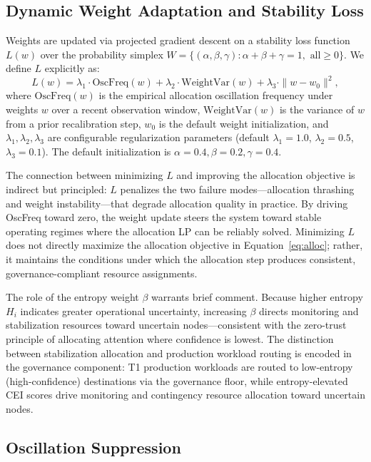 \documentclass[runningheads]{llncs}
\begin{document}
\subsection{Dynamic Weight Adaptation and Stability Loss}

Weights are updated via projected gradient descent on a stability loss function $L(w)$ over the probability simplex $W = \{(\alpha, \beta, \gamma) : \alpha + \beta + \gamma = 1, \text{ all} \geq 0\}$. We define $L$ explicitly as:
\begin{equation}
L(w) = \lambda_1 \cdot \text{OscFreq}(w) + \lambda_2 \cdot \text{WeightVar}(w) + \lambda_3 \cdot \|w - w_0\|^2,
\label{eq:stability}
\end{equation}
where $\text{OscFreq}(w)$ is the empirical allocation oscillation frequency under weights $w$ over a recent observation window, $\text{WeightVar}(w)$ is the variance of $w$ from a prior recalibration step, $w_0$ is the default weight initialization, and $\lambda_1, \lambda_2, \lambda_3$ are configurable regularization parameters (default $\lambda_1 = 1.0$, $\lambda_2 = 0.5$, $\lambda_3 = 0.1$). The default initialization is $\alpha = 0.4, \beta = 0.2, \gamma = 0.4$.

The connection between minimizing $L$ and improving the allocation objective is indirect but principled: $L$ penalizes the two failure modes---allocation thrashing and weight instability---that degrade allocation quality in practice. By driving OscFreq toward zero, the weight update steers the system toward stable operating regimes where the allocation LP can be reliably solved. Minimizing $L$ does not directly maximize the allocation objective in Equation~\ref{eq:alloc}; rather, it maintains the conditions under which the allocation step produces consistent, governance-compliant resource assignments.

The role of the entropy weight $\beta$ warrants brief comment. Because higher entropy $H_i$ indicates greater operational uncertainty, increasing $\beta$ directs monitoring and stabilization resources toward uncertain nodes---consistent with the zero-trust principle of allocating attention where confidence is lowest. The distinction between stabilization allocation and production workload routing is encoded in the governance component: T1 production workloads are routed to low-entropy (high-confidence) destinations via the governance floor, while entropy-elevated CEI scores drive monitoring and contingency resource allocation toward uncertain nodes.

\subsection{Oscillation Suppression}
\end{document}
